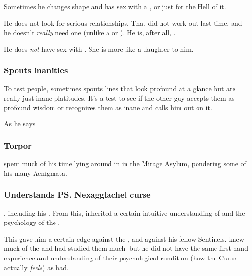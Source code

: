 Sometimes he changes shape and has sex with a \resvil, \human{} or \nephil{} just for the Hell of it. 

He does not look for serious relationships. 
That did not work out last time, and he doesn't \emph{really} need one (unlike a \human{} or \scatha). 
He is, after all, . 

He does \emph{not} have sex with . 
She is more like a daughter to him. 





\subsubsection{Spouts inanities}
To test people, \Ishnaruchaefir{} sometimes spouts lines that look profound at a glance but are really just inane platitudes. It's a test to see if the other guy accepts them as profound wisdom or recognizes them as inane and calls him out on it. 

As he says: 





\subsubsection{Torpor}
\Ishnaruchaefir{} spent much of his time lying around in  in the Mirage Asylum, pondering some of his many Aenigmata. 





\subsubsection{Understands \ps{Nexagglachel} curse}
\Ishnaruchaefir{} , including his . 
From this, \Ishnaruchaefir{} {inherited a certain intuitive understanding} of  and the psychology of the \satharioth. 

This gave him a certain edge against the \satharioth, and against his fellow Sentinels. 
\Secherdamon{} knew much of the \resphain{} and had studied them much, but he did not have the same first hand experience and understanding of their psychological condition (how the Curse actually \emph{feels}) as \Ishnaruchaefir{} had. 









